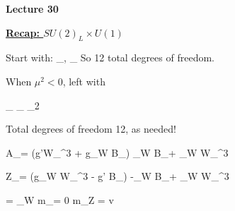 
\usepackage{braket}
\usepackage{bbm}
\usepackage{relsize}
\usepackage{tcolorbox}




\usepackage{fancyhdr}
\usepackage{ dsfont }


\fancyhf{}


\thispagestyle{fancy}

\begin{center}
{\huge \textbf{Lecture 30}}
\end{center}

{\fontsize{14}{16}\selectfont


\textbf{\underline{Recap: $SU(2)_L \times U(1)$}}


Start with:  
\be
{}_{}, \hspace*{0.2in} _{}
\ee
So 12 total degrees of freedom.

When $\mu^2 < 0$, left with


\be
{}_{} \hspace*{0.3in} _{} \hspace*{0.3in} \underbrace{\gamma}_{2}
\ee

Total degrees of freedom 12, as needed!


\be
A_\mu = (g'W_\mu^3 + g_W B_\mu)  \equiv \cos \theta_W B_\mu + \sin \theta_W W_\mu^3
\ee

\be
Z_\mu = (g_W W_\mu^3 - g' B_\mu)  \equiv -\sin \theta_W B_\mu + \cos \theta_W W_\mu^3
\ee

\be
{} = \tan \theta_W  \hspace*{1in} m_\gamma = 0 \hspace*{1in} m_Z =   v
\ee


}
